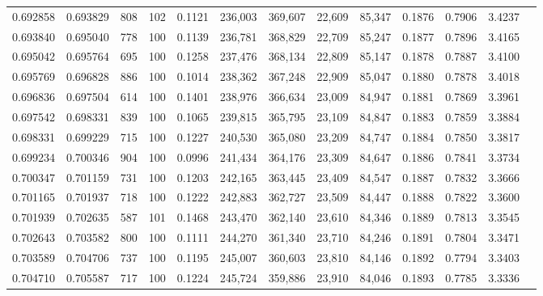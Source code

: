 \begin{tabular}{rrrrrrrrrrrrr}
0.692858 & 0.693829 &   808 & 102 &                                     0.1121 & 236,003 & 369,607 &  22,609 &  85,347 & 0.1876 & 0.7906 & 3.4237 \\
0.693840 & 0.695040 &   778 & 100 &                                     0.1139 & 236,781 & 368,829 &  22,709 &  85,247 & 0.1877 & 0.7896 & 3.4165 \\
0.695042 & 0.695764 &   695 & 100 &                                     0.1258 & 237,476 & 368,134 &  22,809 &  85,147 & 0.1878 & 0.7887 & 3.4100 \\
0.695769 & 0.696828 &   886 & 100 &                                     0.1014 & 238,362 & 367,248 &  22,909 &  85,047 & 0.1880 & 0.7878 & 3.4018 \\
0.696836 & 0.697504 &   614 & 100 &                                     0.1401 & 238,976 & 366,634 &  23,009 &  84,947 & 0.1881 & 0.7869 & 3.3961 \\
0.697542 & 0.698331 &   839 & 100 &                                     0.1065 & 239,815 & 365,795 &  23,109 &  84,847 & 0.1883 & 0.7859 & 3.3884 \\
0.698331 & 0.699229 &   715 & 100 &                                     0.1227 & 240,530 & 365,080 &  23,209 &  84,747 & 0.1884 & 0.7850 & 3.3817 \\
0.699234 & 0.700346 &   904 & 100 &                                     0.0996 & 241,434 & 364,176 &  23,309 &  84,647 & 0.1886 & 0.7841 & 3.3734 \\
0.700347 & 0.701159 &   731 & 100 &                                     0.1203 & 242,165 & 363,445 &  23,409 &  84,547 & 0.1887 & 0.7832 & 3.3666 \\
0.701165 & 0.701937 &   718 & 100 &                                     0.1222 & 242,883 & 362,727 &  23,509 &  84,447 & 0.1888 & 0.7822 & 3.3600 \\
0.701939 & 0.702635 &   587 & 101 &                                     0.1468 & 243,470 & 362,140 &  23,610 &  84,346 & 0.1889 & 0.7813 & 3.3545 \\
0.702643 & 0.703582 &   800 & 100 &                                     0.1111 & 244,270 & 361,340 &  23,710 &  84,246 & 0.1891 & 0.7804 & 3.3471 \\
0.703589 & 0.704706 &   737 & 100 &                                     0.1195 & 245,007 & 360,603 &  23,810 &  84,146 & 0.1892 & 0.7794 & 3.3403 \\
0.704710 & 0.705587 &   717 & 100 &                                     0.1224 & 245,724 & 359,886 &  23,910 &  84,046 & 0.1893 & 0.7785 & 3.3336 \\

\end{tabular}
